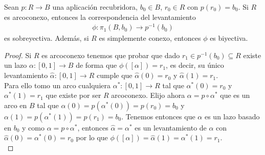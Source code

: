 \begin{ejemplo}
\begin{figure}[H]
%
    \end{figure}%
\end{ejemplo}

\begin{teo}
    Sean $p:R \to B$ una aplicación recubridora, $b_0\in B$, $r_0\in R$ con $p(r_0)=b_0$. Si $R$ es arcoconexo, entonces la correspondencia del levantamiento 
    \begin{align*}
        \phi: \pi_1(B,b_0) \to p^{-1}(b_0)
    \end{align*}
    es sobreyectiva. Además, si $R$ es simplemente conexo, entonces $\phi$ es biyectiva.
    \begin{proof}
        Si $R$ es arcoconexo tenemos que probar que dado $r_1\in p^{-1}(b_0)\subseteq R$ existe un lazo $\alpha:[0,1]\to B$ de forma que $\phi([\alpha]) = r_1$, es decir, su único levantamiento $\hat{\alpha}:[0,1]\to R$ cumple que $\hat{\alpha}(0) = r_0$ y $\hat{\alpha}(1) = r_1$.\\

        Para ello tomo un arco cualquiera $\alpha^*:[0,1]\to R$ tal que $\alpha^*(0) = r_0$ y $\alpha^*(1) = r_1$ que existe por ser $R$ arcoconexo. Elijo ahora $\alpha = p\circ \alpha^*$ que es un arco en $B$ tal que $\alpha(0)= p(\alpha^*(0)) = p(r_0) = b_0$ y $\alpha(1) = p(\alpha^*(1)) = p(r_1) = b_0$. Tenemos entonces que $\alpha$ es un lazo basado en $b_0$ y como $\alpha=p\circ \alpha^*$, entonces $\hat{\alpha} = \alpha^*$ es un levantamiento de $\alpha$ con $\hat{\alpha}(0) = \alpha^*(0) = r_0$ por lo que $\phi([\alpha]) = \hat{\alpha}(1) = \alpha^*(1) = r_1$.\\


\end{proof}
\end{teo}
